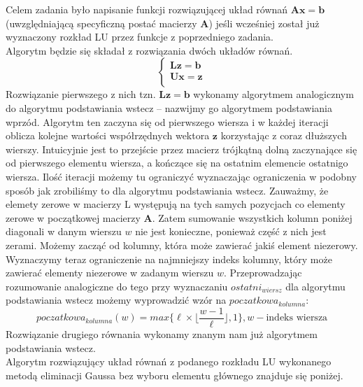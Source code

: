 \documentclass[]{article}
\newcommand{\mA}{\bm{A}}
\newcommand{\mL}{\bm{L}}
\newcommand{\mU}{\bm{U}}
\newcommand{\vb}{\bm{b}}
\newcommand{\vx}{\bm{x}}
\begin{document}
	Celem zadania było napisanie funkcji rozwiązującej układ równań $\mA\vx=\vb$ (uwzględniającą specyficzną postać macierzy $\mA$) jeśli wcześniej został już wyznaczony rozkład LU przez funkcje z poprzedniego zadania.\\
	Algorytm będzie się składał z rozwiązania dwóch układów równań.
	 $$\left\{
	\begin{array}{ll}
	\mL \bm{z}= \vb\\
	\mU \vx= \bm{z} \\
	\end{array}
	\right.$$
	Rozwiązanie pierwszego z nich tzn. $\mL \bm{z}= \vb$ wykonamy algorytmem analogicznym do algorytmu podstawiania wstecz -- nazwijmy go algorytmem podstawiania wprzód. Algorytm ten zaczyna się od pierwszego wiersza i w każdej iteracji oblicza kolejne wartości współrzędnych wektora $\bm{z}$ korzystając z coraz dłuższych wierszy. Intuicyjnie jest to przejście przez macierz trójkątną dolną zaczynające się od pierwszego elementu wiersza, a kończące się na ostatnim elemencie ostatnigo wiersza. Ilość iteracji możemy tu ograniczyć wyznaczając ograniczenia w podobny sposób jak zrobiliśmy to dla algorytmu podstawiania wstecz. Zauważmy, że elemety zerowe w macierzy L występują na tych samych pozycjach co elementy zerowe w początkowej macierzy $\mA$. Zatem sumowanie wszystkich kolumn poniżej diagonali w danym wierszu $w$ nie jest konieczne, ponieważ część z nich jest zerami. Możemy zacząć od kolumny, która może zawierać jakiś element niezerowy. Wyznaczymy teraz ograniczenie na najmniejszy indeks kolumny, który może zawierać elementy niezerowe w zadanym wierszu $w$. 
	Przeprowadzając rozumowanie analogiczne do tego przy wyznaczaniu $ostatni_{wiersz}$ dla algorytmu podstawiania wstecz możemy wyprowadzić wzór na $poczatkowa_{kolumna}$:
	$$poczatkowa_{kolumna}(w) = max\lbrace \ell \times \lfloor \frac{w-1}{\ell}\rfloor , 1 \rbrace, w - \text{indeks wiersza}$$
	Rozwiązanie drugiego równania wykonamy znanym nam już algorytmem podstawiania wstecz.\\
	Algorytm rozwiązujący układ równań z podanego rozkładu LU wykonanego metodą eliminacji Gaussa bez wyboru elementu głównego znajduje się poniżej.
	
\end{document}
